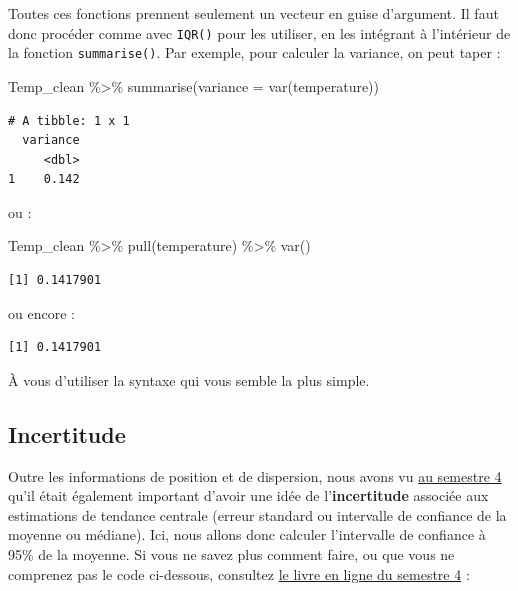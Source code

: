 \documentclass[
  a4paper,
  DIV=11,
  numbers=noendperiod,
  oneside]{scrreprt}
\newenvironment{Shaded}{}{}
\newcommand{\AttributeTok}[1]{\textcolor[rgb]{0.84,0.23,0.29}{#1}}
\newcommand{\FunctionTok}[1]{\textcolor[rgb]{0.44,0.26,0.76}{#1}}
\newcommand{\NormalTok}[1]{\textcolor[rgb]{0.14,0.16,0.18}{#1}}
\newcommand{\SpecialCharTok}[1]{\textcolor[rgb]{0.00,0.36,0.77}{#1}}
\begin{document}
Toutes ces fonctions prennent seulement un vecteur en guise d'argument.
Il faut donc procéder comme avec \texttt{IQR()} pour les utiliser, en
les intégrant à l'intérieur de la fonction \texttt{summarise()}. Par
exemple, pour calculer la variance, on peut taper :

\begin{Shaded}
\begin{Highlighting}[]
\NormalTok{Temp\_clean }\SpecialCharTok{\%\textgreater{}\%} 
  \FunctionTok{summarise}\NormalTok{(}\AttributeTok{variance =} \FunctionTok{var}\NormalTok{(temperature))}
\end{Highlighting}
\end{Shaded}

\begin{verbatim}
# A tibble: 1 x 1
  variance
     <dbl>
1    0.142
\end{verbatim}

ou :

\begin{Shaded}
\begin{Highlighting}[]
\NormalTok{Temp\_clean }\SpecialCharTok{\%\textgreater{}\%}
  \FunctionTok{pull}\NormalTok{(temperature) }\SpecialCharTok{\%\textgreater{}\%}
  \FunctionTok{var}\NormalTok{()}
\end{Highlighting}
\end{Shaded}

\begin{verbatim}
[1] 0.1417901
\end{verbatim}

ou encore :

\begin{Shaded}
\end{Shaded}

\begin{verbatim}
[1] 0.1417901
\end{verbatim}

À vous d'utiliser la syntaxe qui vous semble la plus simple.

\hypertarget{sec-ic95}{%
\subsection{Incertitude}\label{sec-ic95}}

Outre les informations de position et de dispersion, nous avons vu
\href{https://besibo.github.io/BiometrieS4/02-incertitude.html\#la-notion-dincertitude}{au
semestre 4} qu'il était également important d'avoir une idée de
l'\textbf{incertitude} associée aux estimations de tendance centrale
(erreur standard ou intervalle de confiance de la moyenne ou médiane).
Ici, nous allons donc calculer l'intervalle de confiance à 95\% de la
moyenne. Si vous ne savez plus comment faire, ou que vous ne comprenez
pas le code ci-dessous, consultez
\href{https://besibo.github.io/BiometrieS4/02-incertitude.html\#sec-confint}{le
livre en ligne du semestre 4} :
\end{document}
